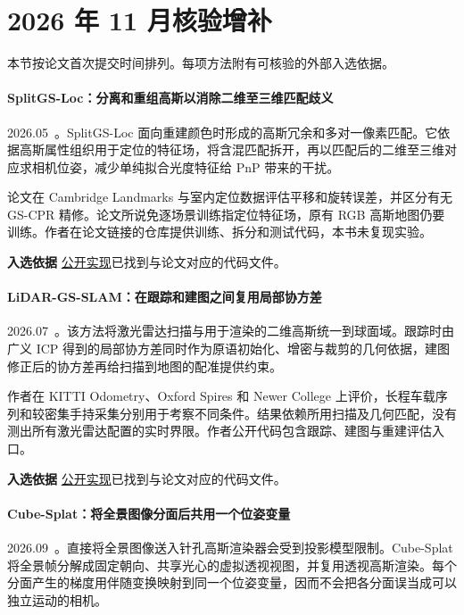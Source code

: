 \section{2026 年 11 月核验增补}

本节按论文首次提交时间排列。每项方法附有可核验的外部入选依据。

\paragraph{SplitGS-Loc：分离和重组高斯以消除二维至三维匹配歧义}
2026.05~\cite{2605_07351}。SplitGS-Loc 面向重建颜色时形成的高斯冗余和多对一像素匹配。它依据高斯属性组织用于定位的特征场，将含混匹配拆开，再以匹配后的二维至三维对应求相机位姿，减少单纯拟合光度特征给 PnP 带来的干扰。

论文在 Cambridge Landmarks 与室内定位数据评估平移和旋转误差，并区分有无 GS-CPR 精修。论文所说免逐场景训练指定位特征场，原有 RGB 高斯地图仍要训练。作者在论文链接的仓库提供训练、拆分和测试代码，本书未复现实验。

\textbf{入选依据} \href{https://github.com/misoleekr/splitgs-loc}{公开实现}已找到与论文对应的代码文件。

\paragraph{LiDAR-GS-SLAM：在跟踪和建图之间复用局部协方差}
2026.07~\cite{2607_04127}。该方法将激光雷达扫描与用于渲染的二维高斯统一到球面域。跟踪时由广义 ICP 得到的局部协方差同时作为原语初始化、增密与裁剪的几何依据，建图修正后的协方差再给扫描到地图的配准提供约束。

作者在 KITTI Odometry、Oxford Spires 和 Newer College 上评价，长程车载序列和较密集手持采集分别用于考察不同条件。结果依赖所用扫描及几何匹配，没有测出所有激光雷达配置的实时界限。作者公开代码包含跟踪、建图与重建评估入口。

\textbf{入选依据} \href{https://github.com/lab-of-ai-and-robotics/lidar-gs-slam}{公开实现}已找到与论文对应的代码文件。

\paragraph{Cube-Splat：将全景图像分面后共用一个位姿变量}
2026.09~\cite{2609_21347}。直接将全景图像送入针孔高斯渲染器会受到投影模型限制。Cube-Splat 将全景帧分解成固定朝向、共享光心的虚拟透视视图，并复用透视高斯渲染。每个分面产生的梯度用伴随变换映射到同一个位姿变量，因而不会把各分面误当成可以独立运动的相机。

